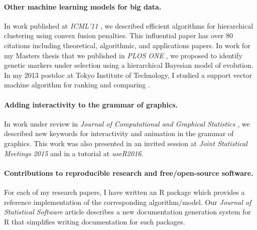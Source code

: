 \documentclass{article}
\begin{document}
\paragraph{Other machine learning models for big data.} In work
published at \emph{ICML'11} \citep{HOCKING-clusterpath}, we described
efficient algorithms for hierarchical clustering using convex fusion
penalties. This influential paper has over 80 citations including
theoretical, algorithmic, and applications papers. In work for my
Masters thesis that we published in \emph{PLOS ONE}
\citep{HOCKING-evolution}, we proposed to identify genetic markers
under selection using a hierarchical Bayesian model of evolution. In
my 2013 postdoc at Tokyo Institute of Technology, I studied a support
vector machine algorithm for ranking and comparing
\citep{svmcompare}. 

\paragraph{Adding interactivity to the grammar of graphics.} In work
under review in \emph{Journal of Computational and Graphical
  Statistics} \citep{animint}, we described new keywords for
interactivity and animation in the grammar of graphics. This work was
also presented in an invited session at \emph{Joint Statistical
  Meetings 2015} and in a tutorial at \emph{useR2016}.

\paragraph{Contributions to reproducible research and free/open-source
  software.} For each of my research papers, I have written an R
package which provides a reference implementation of the corresponding
algorithm/model. Our \emph{Journal of Statistical Software} article
\citep{hocking13:inlinedocs} describes a new documentation generation
system for R that simplifies writing documentation for such packages.
\end{document}
